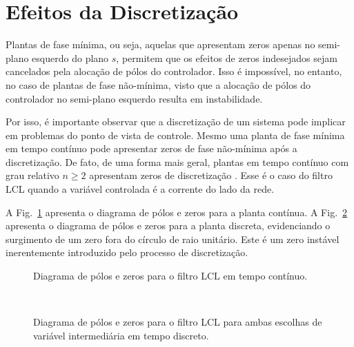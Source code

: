\section{Efeitos da Discretização}

  Plantas de fase mínima, ou seja, aquelas que apresentam zeros apenas no semi-plano esquerdo do plano $s$, permitem que os efeitos de zeros indesejados sejam cancelados pela alocação de pólos do controlador. Isso é impossível, no entanto, no caso de plantas de fase não-mínima, visto que a alocação de pólos do controlador no semi-plano esquerdo resulta em instabilidade.

  Por isso, é importante observar que a discretização de um sistema pode implicar em problemas do ponto de vista de controle. Mesmo uma planta de fase mínima em tempo contínuo pode apresentar zeros de fase não-mínima após a discretização. De fato, de uma forma mais geral, plantas em tempo contínuo com grau relativo $n \ge 2$ apresentam zeros de discretização \cite{ref:ASTROM}. Esse é o caso do filtro LCL quando a variável controlada é a corrente do lado da rede.


  A Fig.~\ref{fig:pzmap_ic_vc} apresenta o diagrama de pólos e zeros para a planta contínua. A Fig.~\ref{fig:pzmap_ic_vc_d} apresenta o diagrama de pólos e zeros para a planta discreta, evidenciando o surgimento de um zero fora do círculo de raio unitário. Este é um zero instável inerentemente introduzido pelo processo de discretização.

  \begin{figure}[htb]
    \centering
    \caption{Diagrama de pólos e zeros para o filtro LCL em tempo contínuo.}
    \label{fig:pzmap_ic_vc}
  \end{figure}

  \begin{figure}[htb]
    \centering
    \\
    \renewcommand\figurename{Fig.}
    \caption{Diagrama de pólos e zeros para o filtro LCL para ambas escolhas de variável intermediária em tempo discreto.}
    \label{fig:pzmap_ic_vc_d}
  \end{figure}


